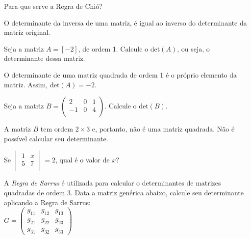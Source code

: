 \documentclass[pdftex, brazil, 12pt, oneside, addpoints]{exam}
\begin{document}
\begin{questions}
\question
Para que serve a Regra de Chió?
\begin{solutionorlines}[0.50in]
  O determinante da inversa de uma matriz, é igual ao inverso do
  determinante da matriz original.
\end{solutionorlines}



\question
Seja a matriz $A = [-2]$, de ordem 1. Calcule o det$(A)$, ou seja, o determinante
dessa matriz.
\begin{solutionorlines}[0.50in]
  O determinante de uma matriz quadrada de ordem 1 é o próprio elemento da matriz.
  Assim, det$(A) = -2$.
\end{solutionorlines}

\question
Seja a matriz $B = \begin{pmatrix}
  2 & 0 & 1\\
 -1 & 0 & 4\\
\end{pmatrix}$. Calcule o det$(B)$.
\begin{solutionorlines}[0.50in]
  A matriz $B$ tem ordem $2 \times 3$ e, portanto, não é uma matriz quadrada.
  Não é possível calcular seu determinante.
\end{solutionorlines}

\question
Se
$\begin{vmatrix}
  1 & x\\
  5 & 7\\
\end{vmatrix} = 2$, qual é o valor de $x$?

\question
A \emph{Regra de Sarrus} é utilizada para calcular o determinantes de matrizes
quadradas de ordem $3$. Data a matriz genérica abaixo, calcule seu
determinante aplicando a Regra de Sarrus:\\%
$G = \begin{pmatrix}
   g_{11} & g_{12} & g_{13}\\
   g_{21} & g_{22} & g_{23}\\
   g_{31} & g_{32} & g_{33}
\end{pmatrix}$


\end{questions}
\end{document}
